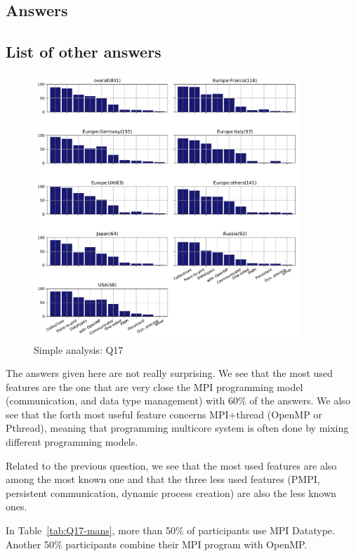 
\subsection{Answers}



\subsection{List of other answers}
\begin{itemize}

\end{itemize}

\begin{figure}[htb]
\begin{center}
\includegraphics[width=10cm]{../pdfs/Q17.pdf}
\caption{Simple analysis: Q17}
\label{fig:Q17}
\end{center}
\end{figure}

The answers given here are not really surprising. We see that the most used
features are the one that are very close the MPI programming model
(communication, and data type management) with 60\% of the answers. We also see
that the forth most useful feature concerns MPI+thread (OpenMP or Pthread),
meaning that programming multicore system is often done by mixing different
programming models.  

Related to the previous question, we see that the most used features are also
among the most known one and that the three less used features (PMPI, persistent
communication, dynamic process creation) are also the less known
ones. 

In Table~\ref{tab:Q17-mans}, more than 50\% of participants use MPI
Datatype. Another 50\% participants combine their MPI program with
OpenMP. 